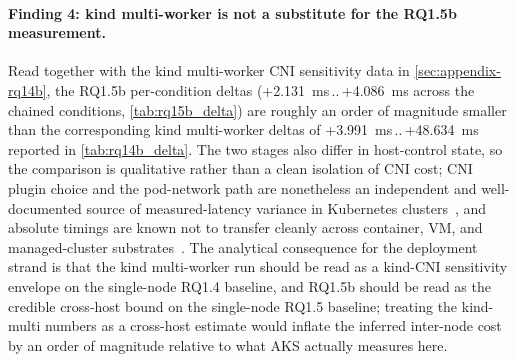 \paragraph{Finding 4: kind multi-worker is not a substitute for the RQ1.5b measurement.}
Read together with the kind multi-worker CNI sensitivity data in
\cref{sec:appendix-rq14b}, the RQ1.5b per-condition deltas
(+2.131~ms\,..\,+4.086~ms across the chained conditions,
\cref{tab:rq15b_delta}) are roughly an order of magnitude smaller than
the corresponding kind multi-worker deltas of +3.991~ms\,..\,+48.634~ms
reported in \cref{tab:rq14b_delta}. The two stages also differ in
host-control state, so the comparison is qualitative rather than a clean
isolation of CNI cost; CNI plugin choice and the pod-network path are
nonetheless an independent and well-documented source of measured-latency
variance in Kubernetes clusters~\cite{cni_k8s_ic2e21}, and absolute
timings are known not to transfer cleanly across container, VM, and
managed-cluster substrates~\cite{virtualization_costs,managed_k8s_perf}.
The analytical consequence for the deployment strand is that the kind
multi-worker run should be read as a kind-CNI sensitivity envelope on
the single-node RQ1.4 baseline, and RQ1.5b should be read as the
credible cross-host bound on the single-node RQ1.5 baseline; treating
the kind-multi numbers as a cross-host estimate would inflate the
inferred inter-node cost by an order of magnitude relative to what AKS
actually measures here.

